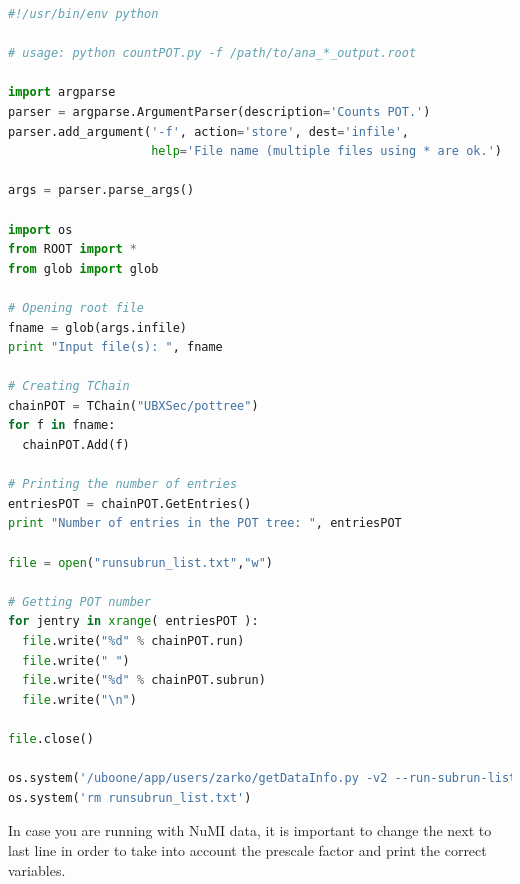 \documentclass[a4paper, oneside, 12pt, onecolumn]{article}
\begin{document}
\begin{mdframed}[style=exampledefault]%
\begin{lstlisting}[label=some-code, language=Python]
#!/usr/bin/env python

# usage: python countPOT.py -f /path/to/ana_*_output.root

import argparse
parser = argparse.ArgumentParser(description='Counts POT.')
parser.add_argument('-f', action='store', dest='infile',
                    help='File name (multiple files using * are ok.')

args = parser.parse_args()

import os
from ROOT import *
from glob import glob

# Opening root file
fname = glob(args.infile)
print "Input file(s): ", fname

# Creating TChain
chainPOT = TChain("UBXSec/pottree")
for f in fname: 
  chainPOT.Add(f)
           
# Printing the number of entries
entriesPOT = chainPOT.GetEntries()
print "Number of entries in the POT tree: ", entriesPOT

file = open("runsubrun_list.txt","w") 

# Getting POT number
for jentry in xrange( entriesPOT ):
  file.write("%d" % chainPOT.run)
  file.write(" ")
  file.write("%d" % chainPOT.subrun)
  file.write("\n")

file.close()

os.system('/uboone/app/users/zarko/getDataInfo.py -v2 --run-subrun-list runsubrun_list.txt')
os.system('rm runsubrun_list.txt')
\end{lstlisting}
\end{mdframed} 

In case you are running with NuMI data, it is important to change the next to last line in order to take into account the prescale factor and print the correct variables.


\renewcommand*{\bibfont}{\footnotesize}
\printbibliography

\end{document}
